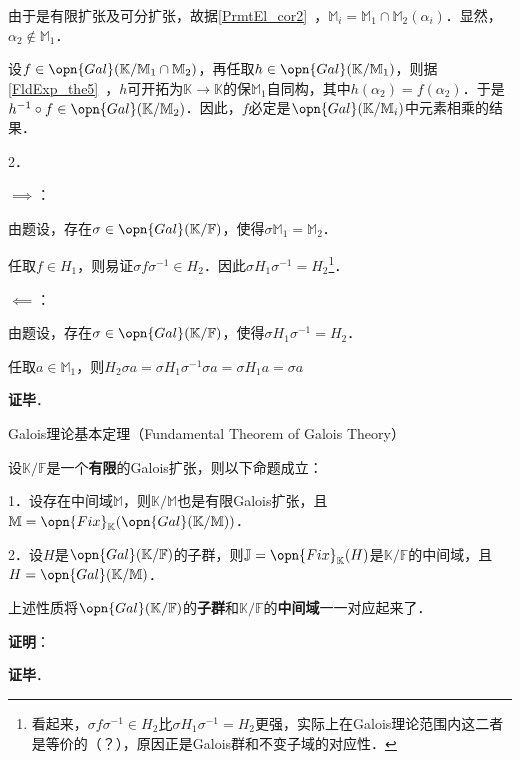 由于是有限扩张及可分扩张，故据\autoref{PrmtEl_cor2}~，$\mathbb{M}_i=\mathbb{M}_1\cap\mathbb{M}_2(\alpha_i)$．显然，$\alpha_2\not\in\mathbb{M}_1$．

设$f\in\opn{Gal}(\mathbb{K}/\mathbb{M}_1\cap\mathbb{M}_2)$，再任取$h\in\opn{Gal}(\mathbb{K}/\mathbb{M}_1)$，则据\autoref{FldExp_the5}~，$h$可开拓为$\mathbb{K}\to\mathbb{K}$的保$\mathbb{M}_1$自同构，其中$h(\alpha_2)=f(\alpha_2)$．于是$h^{-1}\circ f\in\opn{Gal}(\mathbb{K}/\mathbb{M}_2)$．因此，$f$必定是$\opn{Gal}(\mathbb{K}/\mathbb{M}_i)$中元素相乘的结果．

2．

$\implies$：

由题设，存在$\sigma\in\opn{Gal}(\mathbb{K}/\mathbb{F})$，使得$\sigma \mathbb{M}_1=\mathbb{M}_2$．

任取$f\in H_1$，则易证$\sigma f\sigma^{-1}\in H_2$．因此$\sigma H_1\sigma^{-1}=H_2$\footnote{看起来，$\sigma f\sigma^{-1}\in H_2$比$\sigma H_1\sigma^{-1}=H_2$更强，实际上在Galois理论范围内这二者是等价的（？），原因正是Galois群和不变子域的对应性．}．

$\impliedby$：

由题设，存在$\sigma\in\opn{Gal}(\mathbb{K}/\mathbb{F})$，使得$\sigma H_1\sigma^{-1}=H_2$．

任取$a\in\mathbb{M}_{1}$，则$H_2 \sigma a=\sigma H_1\sigma^{-1}\sigma a=\sigma H_1 a=\sigma a$




\textbf{证毕}．














\begin{theorem}{Galois理论基本定理（Fundamental Theorem of Galois Theory）}

设$\mathbb{K}/\mathbb{F}$是一个\textbf{有限}的Galois扩张，则以下命题成立：

1．设存在中间域$\mathbb{M}$，则$\mathbb{K}/\mathbb{M}$也是有限Galois扩张，且$\mathbb{M}=\opn{Fix}_\mathbb{K}(\opn{Gal}(\mathbb{K}/\mathbb{M}))$．

2．设$H$是$\opn{Gal}(\mathbb{K}/\mathbb{F})$的子群，则$\mathbb{J}=\opn{Fix}_\mathbb{K}(H)$是$\mathbb{K}/\mathbb{F}$的中间域，且$H=\opn{Gal}(\mathbb{K}/\mathbb{M})$．

上述性质将$\opn{Gal}(\mathbb{K}/\mathbb{F})$的\textbf{子群}和$\mathbb{K}/\mathbb{F}$的\textbf{中间域}一一对应起来了．

\end{theorem}

\textbf{证明}：



\textbf{证毕}．


















